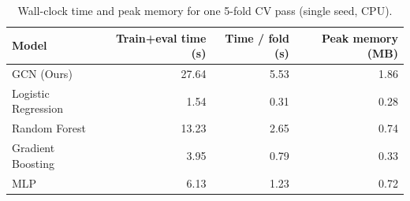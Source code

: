 \begin{table}[t]
\centering
\caption{Wall-clock time and peak memory for one 5-fold CV pass (single seed, CPU).}
\label{tab:runtime}
\footnotesize
\begin{tabular}{lrrr}
\toprule
Model & Train+eval time (s) & Time / fold (s) & Peak memory (MB) \\
\midrule
GCN (Ours) & 27.64 & 5.53 & 1.86 \\
Logistic Regression & 1.54 & 0.31 & 0.28 \\
Random Forest & 13.23 & 2.65 & 0.74 \\
Gradient Boosting & 3.95 & 0.79 & 0.33 \\
MLP & 6.13 & 1.23 & 0.72 \\
\bottomrule
\end{tabular}
\end{table}

